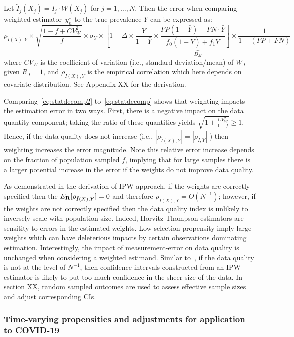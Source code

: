 \documentclass[11pt]{amsart}
\begin{document}
Let $\tilde I_j (X_j) = I_j  \cdot W(X_j)$ for $j=1,\ldots,N$.  Then the error when comparing weighted estimator~$\bar y_n^\star$ to the true prevalence $\bar Y$ can be expressed as:
\begin{equation}
\label{eq:statdecomp2}
\rho_{\tilde I (X), Y} \times \sqrt{\frac{1-f+ CV^2_W}{f}} \times \sigma_{Y} \times \underbrace{\left[ 1 - \Delta \times \frac{\bar Y}{1-\bar Y} \times \frac{FP(1-\bar Y) + FN \cdot \bar Y}{f_0 (1-\bar Y) + f_1 \bar Y} \right] \times \frac{1}{1-(FP+FN)}}_{D_M}
\end{equation}
where $CV_W$ is the coefficient of variation (i.e., standard deviation/mean) of $W_J$ given $R_J = 1$, and $\rho_{\tilde I(X), Y}$ is the empirical correlation which here depends on covariate distribution.  See Appendix XX for the derivation.

Comparing~\eqref{eq:statdecomp2} to~\eqref{eq:statdecomp} shows that weighting impacts the estimation error in two ways.  First, there is a negative impact on the data quantity component; taking the ratio of these quantities yields
$\sqrt{1 + \frac{CV_W^2}{1-f}} \geq 1$.  Hence, if the data quality does not increase (i.e., $| \rho_{\tilde I (X), Y} | = | \rho_{I,Y}|$ ) then weighting increases the error magnitude.  Note this relative error increase depends on the fraction of population sampled $f$, implying that for large samples there is a larger potential increase in the error if the weights do not improve data quality.

As demonstrated in the derivation of IPW approach, if the weights are correctly specified then the $E_{\bf R} [ \rho_{\tilde I (X), Y} ] = 0$ and therefore $\rho_{\tilde I(X), Y} = O(N^{-1})$; however, if the weights are not correctly specified then the data quality index is unlikely to inversely scale with population size.  Indeed, Horvitz-Thompson estimators are sensitity to errors in the estimated weights.  Low selection propensity imply large weights which can have deleterious impacts by certain observations dominating estimation. Interestingly, the impact of measurement-error on data quality is unchanged when considering a weighted estimand.  Similar to~\cite{Meng2018}, if the data quality is not at the level of $N^{-1}$, then confidence intervals constructed from an IPW estimator is likely to put too much confidence in the sheer size of the data.  In section XX, random sampled outcomes are used to assess effective sample sizes and adjust corresponding CIs.

\subsubsection{Time-varying propensities and adjustments for application to COVID-19}
\end{document}
